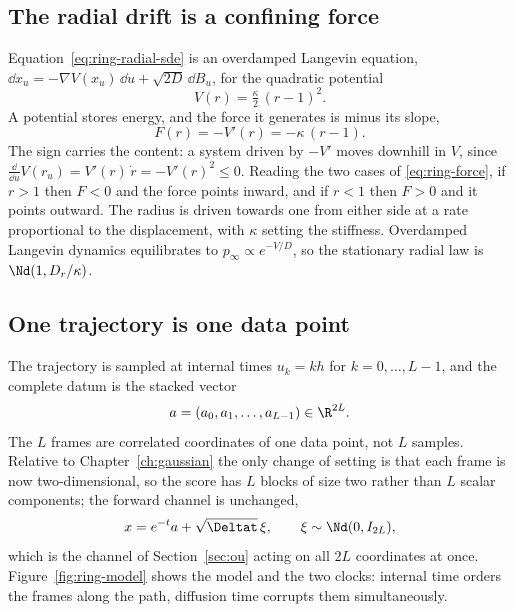 \subsection{The radial drift is a confining force}

Equation~\eqref{eq:ring-radial-sde} is an overdamped Langevin equation,
$\dd x_u = -\nabla V(x_u)\,\dd u + \sqrt{2D}\,\dd B_u$, for the quadratic
potential
\begin{equation}
  V(r) = \tfrac{\kappa}{2}\,(r-1)^2 .
  \label{eq:ring-potential}
\end{equation}
A potential stores energy, and the force it generates is minus its slope,
\begin{equation}
  F(r) = -V'(r) = -\kappa\,(r-1) .
  \label{eq:ring-force}
\end{equation}
The sign carries the content: a system driven by $-V'$ moves downhill in $V$,
since $\tfrac{\dd}{\dd u} V(r_u) = V'(r)\,\dot r = -V'(r)^2 \le 0$. Reading the
two cases of \eqref{eq:ring-force}, if $r > 1$ then $F < 0$ and the force points
inward, and if $r < 1$ then $F > 0$ and it points outward. The radius is driven
towards one from either side at a rate proportional to the displacement, with
$\kappa$ setting the stiffness. Overdamped Langevin dynamics equilibrates to
$p_\infty \propto e^{-V/D}$, so the stationary radial law is
$\Nd(1, D_r/\kappa)$.

\subsection{One trajectory is one data point}

The trajectory is sampled at internal times $u_k = k h$ for
$k = 0, \dots, L-1$, and the complete datum is the stacked vector
\begin{equation}
  a = (a_0, a_1, \dots, a_{L-1}) \in \R^{2L} .
  \label{eq:ring-datum}
\end{equation}
The $L$ frames are correlated coordinates of one data point, not $L$ samples.
Relative to Chapter~\ref{ch:gaussian} the only change of setting is that each
frame is now two-dimensional, so the score has $L$ blocks of size two rather
than $L$ scalar components; the forward channel is unchanged,
\begin{equation}
  x = e^{-t} a + \sqrt{\Deltat}\, \xi , \qquad \xi \sim \Nd(0, I_{2L}) ,
  \label{eq:ring-channel}
\end{equation}
which is the channel of Section~\ref{sec:ou} acting on all $2L$ coordinates at
once. Figure~\ref{fig:ring-model} shows the model and the two clocks: internal
time orders the frames along the path, diffusion time corrupts them
simultaneously.

